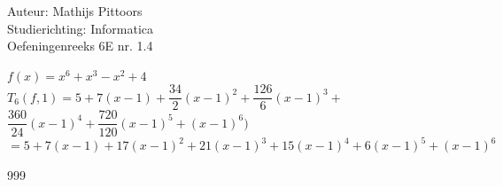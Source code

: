 \documentclass[a4paper]{article}
\begin{document}
  
\noindent \large Auteur: Mathijs Pittoors \\
\noindent \large Studierichting: Informatica\\
\noindent \large Oefeningenreeks 6E nr. 1.4\\

\medskip

\normalsize
$f(x) = x^6 + x^3 - x^2 + 4$\\

$T_6(f, 1) = 5 + 7(x-1) + \dfrac{34}{2} (x-1)^2 + \dfrac{126}{6}(x-1)^3 + $\\

$\dfrac{360}{24}(x-1)^4 + \dfrac{720}{120} (x-1)^5 + (x-1)^6)$\\

$ = 5 + 7(x-1) + 17(x-1)^2 + 21(x-1)^3 + 15(x-1)^4 + 6(x-1)^5 + (x-1)^6$



\begin{thebibliography}{999}
\end{thebibliography}
\end{document}
